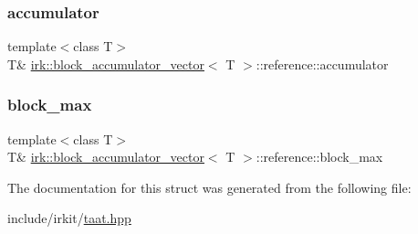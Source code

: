 \subsubsection{\texorpdfstring{accumulator}{accumulator}}
{\footnotesize\ttfamily template$<$class T$>$ \\
T\& \mbox{\hyperlink{structirk_1_1block__accumulator__vector}{irk\+::block\+\_\+accumulator\+\_\+vector}}$<$ T $>$\+::reference\+::accumulator}

\mbox{\label{structirk_1_1block__accumulator__vector_1_1reference_a39131492f59bc26cf6f8fa28e796f904}} 
\subsubsection{\texorpdfstring{block\+\_\+max}{block\_max}}
{\footnotesize\ttfamily template$<$class T$>$ \\
T\& \mbox{\hyperlink{structirk_1_1block__accumulator__vector}{irk\+::block\+\_\+accumulator\+\_\+vector}}$<$ T $>$\+::reference\+::block\+\_\+max}



The documentation for this struct was generated from the following file\+:\begin{DoxyCompactItemize}
\item 
include/irkit/\mbox{\hyperlink{taat_8hpp}{taat.\+hpp}}\end{DoxyCompactItemize}
